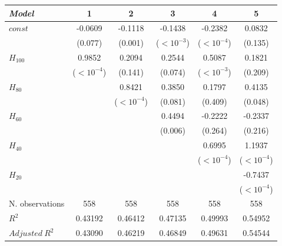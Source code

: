 \begin{tabular}{lccccc}
\toprule
\textit{Model} & 1 & 2 & 3 & 4 & 5 \\
\midrule
$\mathit{const}$ & -0.0609 & -0.1118 & -0.1438 & -0.2382 & 0.0832 \\
 & {\scriptsize (0.077)} & {\scriptsize (0.001)} & {\scriptsize ($<10^{-3}$)} & {\scriptsize ($<10^{-4}$)} & {\scriptsize (0.135)} \\
$H_{100}$ & 0.9852 & 0.2094 & 0.2544 & 0.5087 & 0.1821 \\
 & {\scriptsize ($<10^{-4}$)} & {\scriptsize (0.141)} & {\scriptsize (0.074)} & {\scriptsize ($<10^{-3}$)} & {\scriptsize (0.209)} \\
$H_{80}$ &  & 0.8421 & 0.3850 & 0.1797 & 0.4135 \\
 &  & {\scriptsize ($<10^{-4}$)} & {\scriptsize (0.081)} & {\scriptsize (0.409)} & {\scriptsize (0.048)} \\
$H_{60}$ &  &  & 0.4494 & -0.2222 & -0.2337 \\
 &  &  & {\scriptsize (0.006)} & {\scriptsize (0.264)} & {\scriptsize (0.216)} \\
$H_{40}$ &  &  &  & 0.6995 & 1.1937 \\
 &  &  &  & {\scriptsize ($<10^{-4}$)} & {\scriptsize ($<10^{-4}$)} \\
$H_{20}$ &  &  &  &  & -0.7437 \\
 &  &  &  &  & {\scriptsize ($<10^{-4}$)} \\
\midrule
N. observations & 558 & 558 & 558 & 558 & 558 \\
$R^2$ & 0.43192 & 0.46412 & 0.47135 & 0.49993 & 0.54952 \\
$\mathit{Adjusted}~R^2$ & 0.43090 & 0.46219 & 0.46849 & 0.49631 & 0.54544 \\
\bottomrule
\end{tabular}
